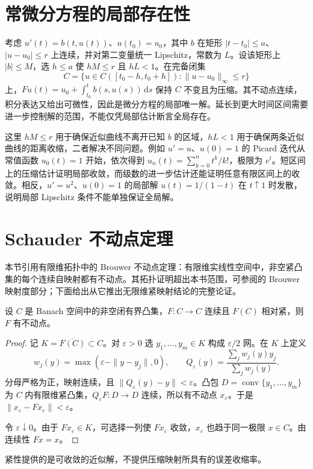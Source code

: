 \section{常微分方程的局部存在性}
考虑 $u'(t)=b(t,u(t))$、$u(t_0)=u_0$，其中 $b$ 在矩形 $|t-t_0|\leq a$、$|u-u_0|\leq r$ 上连续，并对第二变量统一 Lipschitz，常数为 $L$。设该矩形上 $|b|\leq M$，选 $h\leq a$ 使 $hM\leq r$ 且 $hL<1$。在完备闭集
\[
 C=\{u\in C([t_0-h,t_0+h]):\|u-u_0\|_\infty\leq r\}
\]
上，$Fu(t)=u_0+\int_{t_0}^t b(s,u(s))\,\mathrm ds$ 保持 $C$ 不变且为压缩。其不动点连续，积分表达又给出可微性，因此是微分方程的局部唯一解。延长到更大时间区间需要进一步控制解的范围，不能仅凭局部估计断言全局存在。

这里 $hM\leq r$ 用于确保近似曲线不离开已知 $b$ 的区域，$hL<1$ 用于确保两条近似曲线的距离收缩，二者解决不同问题。例如 $u'=u$、$u(0)=1$ 的 Picard 迭代从常值函数 $u_0(t)=1$ 开始，依次得到 $u_n(t)=\sum_{k=0}^nt^k/k!$，极限为 $e^t$。短区间上的压缩估计证明局部收敛，而级数的进一步估计还能证明任意有限区间上的收敛。相反，$u'=u^2$、$u(0)=1$ 的局部解 $u(t)=1/(1-t)$ 在 $t\uparrow1$ 时发散，说明局部 Lipschitz 条件不能单独保证全局解。

\section{Schauder 不动点定理}
本节引用有限维拓扑中的 Brouwer 不动点定理：有限维实线性空间中，非空紧凸集的每个连续自映射都有不动点。其拓扑证明超出本书范围，可参阅\cite{teschl-fa}的 Brouwer 映射度部分；下面给出从它推出无限维紧映射结论的完整论证。

\begin{theorem}[Schauder]\label{thm:fa-schauder}
设 $C$ 是 Banach 空间中的非空闭有界凸集，$F:C\to C$ 连续且 $F(C)$ 相对紧，则 $F$ 有不动点。
\end{theorem}
\begin{proof}
记 $K=\overline{F(C)}\subset C$。对 $\varepsilon>0$ 选 $y_1,\ldots,y_m\in K$ 构成 $\varepsilon/2$ 网。在 $K$ 上定义
\[
 w_j(y)=\max(\varepsilon-\|y-y_j\|,0),\qquad
 Q_\varepsilon(y)=\frac{\sum_jw_j(y)y_j}{\sum_jw_j(y)}.
\]
分母严格为正，映射连续，且 $\|Q_\varepsilon(y)-y\|<\varepsilon$。凸包 $D=\operatorname{conv}\{y_1,\ldots,y_m\}$ 为 $C$ 内有限维紧凸集，$Q_\varepsilon F:D\to D$ 连续，所以有不动点 $x_\varepsilon$。于是 $\|x_\varepsilon-Fx_\varepsilon\|<\varepsilon$。

令 $\varepsilon\downarrow0$。由于 $Fx_\varepsilon\in K$，可选择一列使 $Fx_\varepsilon$ 收敛，$x_\varepsilon$ 也趋于同一极限 $x\in C$。由连续性 $Fx=x$。
\end{proof}
紧性提供的是可收敛的近似解，不提供压缩映射所具有的误差收缩率。

